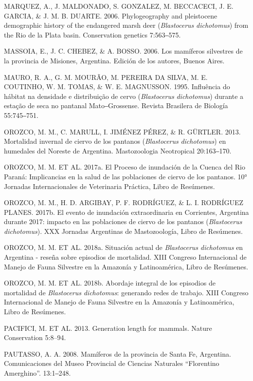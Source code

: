 \documentclass[
  x11names]{article}
\begin{document}
MARQUEZ, A., J. MALDONADO, S. GONZALEZ, M. BECCACECI, J. E. GARCIA, \&
J. M. B. DUARTE. 2006. Phylogeography and pleistocene demographic
history of the endangered marsh deer (\textit{Blastocerus}
\textit{dichotomus}) from the Rio de la Plata basin. Conservation
genetics 7:563‒575.

MASSOIA, E., J. C. CHEBEZ, \& A. BOSSO. 2006. Los mamíferos silvestres
de la provincia de Misiones, Argentina. Edición de los autores, Buenos
Aires.

MAURO, R. A., G. M. MOURÃO, M. PEREIRA DA SILVA, M. E. COUTINHO, W. M.
TOMAS, \& W. E. MAGNUSSON. 1995. Influência do hábitat na densidade e
distribuição de cervo (\textit{Blastocerus} \textit{dichotomus}) durante
a estação de seca no pantanal Mato‒Grossense. Revista Brasilera de
Biología 55:745‒751.

OROZCO, M. M., C. MARULL, I. JIMÉNEZ PÉREZ, \& R. GÜRTLER. 2013.
Mortalidad invernal de ciervo de los pantanos (\textit{Blastocerus}
\textit{dichotomus}) en humedales del Noreste de Argentina.
Mastozoologia Neotropical 20:163‒170.

OROZCO, M. M. ET AL. 2017a. El Proceso de inundación de la Cuenca del
Rio Paraná: Implicancias en la salud de las poblaciones de ciervo de los
pantanos. 10° Jornadas Internacionales de Veterinaria Práctica, Libro de
Resúmenes.

OROZCO, M. M., H. D. ARGIBAY, P. F. RODRÍGUEZ, \& L. I. RODRÍGUEZ
PLANES. 2017b. El evento de inundación extraordinaria en Corrientes,
Argentina durante 2017: impacto en las poblaciones de ciervo de los
pantanos (\textit{Blastocerus} \textit{dichotomus}). XXX Jornadas
Argentinas de Mastozoología, Libro de Resúmenes.

OROZCO, M. M. ET AL. 2018a. Situación actual de \textit{Blastocerus}
\textit{dichotomus} en Argentina - reseña sobre episodios de mortalidad.
XIII Congreso Internacional de Manejo de Fauna Silvestre en la Amazonía
y Latinoamérica, Libro de Resúmenes.

OROZCO, M. M. ET AL. 2018b. Abordaje integral de los episodios de
mortalidad de \textit{Blastocerus} \textit{dichotomus}: generando redes
de trabajo. XIII Congreso Internacional de Manejo de Fauna Silvestre en
la Amazonía y Latinoamérica, Libro de Resúmenes.

PACIFICI, M. ET AL. 2013. Generation length for mammals. Nature
Conservation 5:8--94.

PAUTASSO, A. A. 2008. Mamíferos de la provincia de Santa Fe, Argentina.
Comunicaciones del Museo Provincial de Ciencias Naturales ``Florentino
Amerghino''. 13:1‒248.
\end{document}
